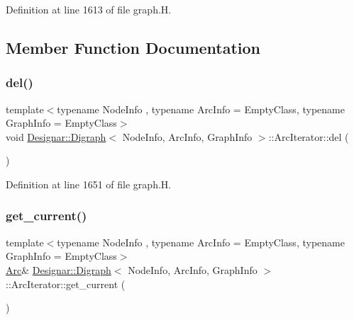 Definition at line 1613 of file graph.\+H.



\subsection{Member Function Documentation}
\mbox{\label{class_designar_1_1_digraph_1_1_arc_iterator_aa4f42b888685025c5c3f2e730df4eb36}} 
\subsubsection{\texorpdfstring{del()}{del()}}
{\footnotesize\ttfamily template$<$typename Node\+Info , typename Arc\+Info  = Empty\+Class, typename Graph\+Info  = Empty\+Class$>$ \\
void \hyperlink{class_designar_1_1_digraph}{Designar\+::\+Digraph}$<$ Node\+Info, Arc\+Info, Graph\+Info $>$\+::Arc\+Iterator\+::del (\begin{DoxyParamCaption}{ }\end{DoxyParamCaption})\hspace{0.3cm}{\ttfamily [inline]}}



Definition at line 1651 of file graph.\+H.

\mbox{\label{class_designar_1_1_digraph_1_1_arc_iterator_af7734cd84a4dd523f276064833abaa85}} 
\subsubsection{\texorpdfstring{get\+\_\+current()}{get\_current()}\hspace{0.1cm}{\footnotesize\ttfamily [1/2]}}
{\footnotesize\ttfamily template$<$typename Node\+Info , typename Arc\+Info  = Empty\+Class, typename Graph\+Info  = Empty\+Class$>$ \\
\hyperlink{class_designar_1_1_digraph_a0ceb278671f2a535c00fddccdeafd69f}{Arc}\& \hyperlink{class_designar_1_1_digraph}{Designar\+::\+Digraph}$<$ Node\+Info, Arc\+Info, Graph\+Info $>$\+::Arc\+Iterator\+::get\+\_\+current (\begin{DoxyParamCaption}{ }\end{DoxyParamCaption})\hspace{0.3cm}{\ttfamily [inline]}}



